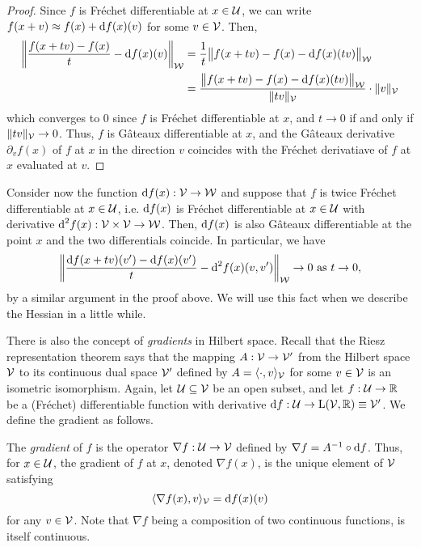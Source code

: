 \begin{proof}
  Since $f$ is Fréchet differentiable at $x\in{\mathcal U}$, we can write $f(x+v) \approx f(x) + \text{d} f(x)(v)$ for some $v\in{\mathcal V}$.
  Then, 
  \begin{align*}
    \left\Vert \frac{f(x + t v) - f(x)}{t} - \text{d} f(x)(v) \right\Vert_{\mathcal W}
    &= \frac{1}{t} \big\Vert f(x + t v) - f(x) - \text{d} f(x)(tv)  \big\Vert_{\mathcal W} \\
    &= \frac{\big\Vert f(x + t v) - f(x) - \text{d} f(x)(tv) \big\Vert_{\mathcal W} }{\lVert tv\rVert_{\mathcal V}}\cdot \lVert v\rVert_{\mathcal V} 
  \end{align*}
  which converges to 0 since $f$ is Fréchet differentiable at $x$, and  $t\to 0$ if and only if $\lVert tv\rVert_{\mathcal V} \to 0$.
  Thus, $f$ is Gâteaux differentiable at $x$, and the Gâteaux derivative $\partial_v f(x)$ of $f$ at $x$ in the direction $v$ coincides with the Fréchet derivatiave of $f$ at $x$ evaluated at $v$.
\end{proof}

Consider now the function $\text{d} f(x):{\mathcal V}\to{\mathcal W}$ and suppose that $f$ is twice Fréchet differentiable at $x\in{\mathcal U}$, i.e. $\text{d} f(x)$ is Fréchet differentiable at $x\in{\mathcal U}$ with derivative $\text{d}^2 f(x):{\mathcal V}\times{\mathcal V} \to {\mathcal W}$.
Then, $\text{d} f(x)$ is also Gâteaux differentiable at the point $x$ and the two differentials coincide.
In particular, we have
\begin{align}\label{eq:frech2gat}
  \left\Vert \frac{\text{d} f(x + t v)(v') - \text{d} f(x)(v')}{t} - \text{d}^2 f(x)(v,v') \right\Vert_{\mathcal W} \to 0 \text{ as } t \to 0,
\end{align}
by a similar argument in the proof above.
We will use this fact when we describe the Hessian in a little while.

There is also the concept of \emph{gradients} in Hilbert space.
Recall that the Riesz representation theorem says that the mapping $A:{\mathcal V}\to{\mathcal V}'$ from the Hilbert space ${\mathcal V}$ to its continuous dual space ${\mathcal V}'$ defined by $A = \langle\cdot,v\rangle_{\mathcal V}$ for some $v\in{\mathcal V}$ is an isometric isomorphism.
Again, let ${\mathcal U} \subseteq {\mathcal V}$ be an open subset, and let $f:{\mathcal U}\to\mathbb{R}$ be a (Fréchet) differentiable function with derivative $\text{d} f: {\mathcal U} \to \text{L}({\mathcal V},\mathbb{R}) \equiv {\mathcal V}'$.
We define the gradient as follows.

\begin{definition}
  The \emph{gradient} of $f$ is the operator $\nabla f: {\mathcal U} \to {\mathcal V}$ defined by $\nabla f = A^{-1} \circ \text{d} f$.
  Thus, for $x \in {\mathcal U}$, the gradient of $f$ at $x$, denoted $\nabla f(x)$, is the unique element of ${\mathcal V}$ satisfying
  \[
    \langle\nabla f(x), v\rangle_{\mathcal V} = \text{d} f(x)(v)
  \]
  for any $v \in {\mathcal V}$.
  Note that $\nabla f$ being a composition of two continuous functions, is itself continuous.
\end{definition}

